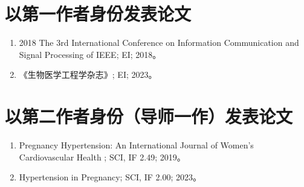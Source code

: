 \cleardoublepage
{}

{%
    \section*{以第一作者身份发表论文}
    \begin{enumerate}
        \item 2018 The 3rd International Conference on Information Communication and Signal Processing of IEEE; EI; 2018。
        \item 《生物医学工程学杂志》; EI; 2023。
    \end{enumerate}

    \section*{以第二作者身份（导师一作）发表论文}
    \begin{enumerate}
        \item Pregnancy Hypertension: An International Journal of Women's Cardiovascular Health ; SCI, IF 2.49; 2019。
        \item Hypertension in Pregnancy; SCI, IF 2.00; 2023。
    \end{enumerate}
}
